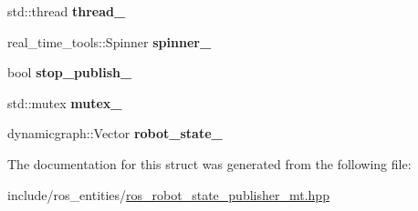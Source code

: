 \begin{DoxyCompactItemize}
\item 
std\+::thread {\bfseries thread\+\_\+}\hypertarget{structdynamic__graph_1_1RosRobotStatePublisherMtInternal_a5df491b287f390cfafcc173181981b25}{}\label{structdynamic__graph_1_1RosRobotStatePublisherMtInternal_a5df491b287f390cfafcc173181981b25}

\item 
real\+\_\+time\+\_\+tools\+::\+Spinner {\bfseries spinner\+\_\+}\hypertarget{structdynamic__graph_1_1RosRobotStatePublisherMtInternal_aa4aa01f9d16725c5e314384111ff563e}{}\label{structdynamic__graph_1_1RosRobotStatePublisherMtInternal_aa4aa01f9d16725c5e314384111ff563e}

\item 
bool {\bfseries stop\+\_\+publish\+\_\+}\hypertarget{structdynamic__graph_1_1RosRobotStatePublisherMtInternal_a8119b11fca598b99c4af814a10778c2c}{}\label{structdynamic__graph_1_1RosRobotStatePublisherMtInternal_a8119b11fca598b99c4af814a10778c2c}

\item 
std\+::mutex {\bfseries mutex\+\_\+}\hypertarget{structdynamic__graph_1_1RosRobotStatePublisherMtInternal_a3103d4fb6f8c909b61dd172424ad462d}{}\label{structdynamic__graph_1_1RosRobotStatePublisherMtInternal_a3103d4fb6f8c909b61dd172424ad462d}

\item 
dynamicgraph\+::\+Vector {\bfseries robot\+\_\+state\+\_\+}\hypertarget{structdynamic__graph_1_1RosRobotStatePublisherMtInternal_a50521c986af60cc19754eeba85f17345}{}\label{structdynamic__graph_1_1RosRobotStatePublisherMtInternal_a50521c986af60cc19754eeba85f17345}

\end{DoxyCompactItemize}


The documentation for this struct was generated from the following file\+:\begin{DoxyCompactItemize}
\item 
include/ros\+\_\+entities/\hyperlink{ros__robot__state__publisher__mt_8hpp}{ros\+\_\+robot\+\_\+state\+\_\+publisher\+\_\+mt.\+hpp}\end{DoxyCompactItemize}
